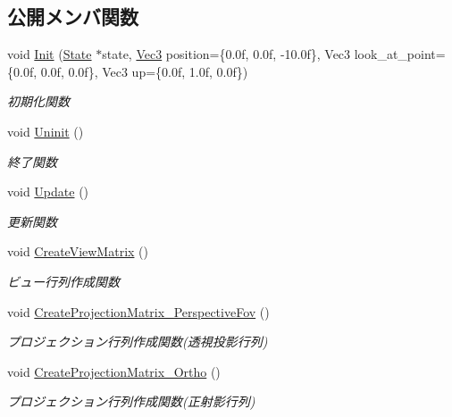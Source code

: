 \subsection*{公開メンバ関数}
\begin{DoxyCompactItemize}
\item 
void \mbox{\hyperlink{class_camera_a03e3ca8b70417632f7b1b581426ec66d}{Init}} (\mbox{\hyperlink{class_camera_1_1_state}{State}} $\ast$state, \mbox{\hyperlink{_vector3_d_8h_ab16f59e4393f29a01ec8b9bbbabbe65d}{Vec3}} position=\{0.\+0f, 0.\+0f, -\/10.\+0f\}, Vec3 look\+\_\+at\+\_\+point=\{0.\+0f, 0.\+0f, 0.\+0f\}, Vec3 up=\{0.\+0f, 1.\+0f, 0.\+0f\})
\begin{DoxyCompactList}\small\item\em 初期化関数 \end{DoxyCompactList}\item 
void \mbox{\hyperlink{class_camera_a8b3337b3e560ea6a780d646bc8c509d7}{Uninit}} ()
\begin{DoxyCompactList}\small\item\em 終了関数 \end{DoxyCompactList}\item 
void \mbox{\hyperlink{class_camera_a4a596a3ea1fdc7d244ba4268031a360b}{Update}} ()
\begin{DoxyCompactList}\small\item\em 更新関数 \end{DoxyCompactList}\item 
void \mbox{\hyperlink{class_camera_a5b4993ffb218536cb31d6d5224453b1a}{Create\+View\+Matrix}} ()
\begin{DoxyCompactList}\small\item\em ビュー行列作成関数 \end{DoxyCompactList}\item 
void \mbox{\hyperlink{class_camera_a1786fe1adbe95e2ffa2de4cdb114546a}{Create\+Projection\+Matrix\+\_\+\+Perspective\+Fov}} ()
\begin{DoxyCompactList}\small\item\em プロジェクション行列作成関数(透視投影行列) \end{DoxyCompactList}\item 
void \mbox{\hyperlink{class_camera_a215010fc78cb35ed588ac9676c166f64}{Create\+Projection\+Matrix\+\_\+\+Ortho}} ()
\begin{DoxyCompactList}\small\item\em プロジェクション行列作成関数(正射影行列) \end{DoxyCompactList}\item 

\end{DoxyCompactItemize}
